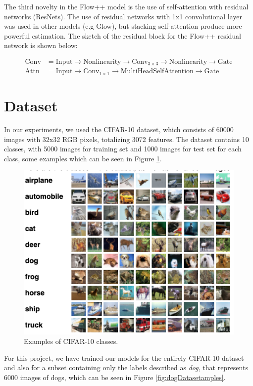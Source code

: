 \documentclass{article}
\begin{document}
The third novelty in the Flow++ model is the use of self-attention with residual networks (ResNets). The use of residual networks with 1x1 convolutional layer was used in other models (e.g Glow), but stacking self-attention produce more powerful estimation. The sketch of the residual block for the Flow++ residual network is shown below:  

\begin{align*} \label{eq:res_block}
  \textrm{Conv} &= \textrm{Input} \rightarrow  \textrm{Nonlinearity} \rightarrow \textrm{Conv}_{3\times 3} \rightarrow \textrm{Nonlinearity} \rightarrow \textrm{Gate} \\
  \textrm{Attn} &= \textrm{Input} \rightarrow \textrm{Conv}_{1\times 1} \rightarrow \textrm{MultiHeadSelfAttention} \rightarrow \textrm{Gate}
\end{align*} 

\section{Dataset}

In our experiments, we used the CIFAR-10 dataset, which consists of 60000 images with 32x32 RGB pixels, totalizing 3072 features. The dataset contains 10 classes, with 5000 images for training set and 1000 images for test set for each class, some examples which can be seen in Figure \ref{fig:cifar}. 

\begin{figure}
  \centering
  \includegraphics[width=0.8\linewidth]{cifar.png}
  \caption{Examples of CIFAR-10 classes.}
  \label{fig:cifar}
\end{figure}

For this project, we have trained our models for the entirely CIFAR-10 dataset and also for a subset containing only the labels described as \emph{dog}, that represents 6000 images of dogs, which can be seen in Figure \ref{fig:dogDatasetamples}. 
\end{document}
